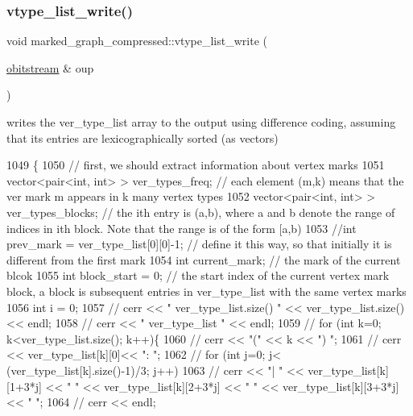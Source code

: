 \subsubsection{\texorpdfstring{vtype\+\_\+list\+\_\+write()}{vtype\_list\_write()}}
{\footnotesize\ttfamily void marked\+\_\+graph\+\_\+compressed\+::vtype\+\_\+list\+\_\+write (\begin{DoxyParamCaption}\item[{\hyperlink{classobitstream}{obitstream} \&}]{oup }\end{DoxyParamCaption})}



writes the ver\+\_\+type\+\_\+list array to the output using difference coding, assuming that its entries are lexicographically sorted (as vectors) 


\begin{DoxyCode}
1049                                                              \{
1050   \textcolor{comment}{// first, we should extract information about vertex marks}
1051   vector<pair<int, int> > ver\_types\_freq; \textcolor{comment}{// each element (m,k) means that the ver mark m appears in k many
       vertex types}
1052   vector<pair<int, int> > ver\_types\_blocks; \textcolor{comment}{// the ith entry is (a,b), where a and b denote the range of
       indices in ith block. Note that the range is of the form [a,b)}
1053   \textcolor{comment}{//int prev\_mark = ver\_type\_list[0][0]-1; // define it this way, so that initially it is different from
       the first mark}
1054   \textcolor{keywordtype}{int} current\_mark; \textcolor{comment}{// the mark of the current blcok}
1055   \textcolor{keywordtype}{int} block\_start = 0; \textcolor{comment}{// the start index of the current vertex mark block, a block is subsequent entries
       in ver\_type\_list with the same vertex marks}
1056   \textcolor{keywordtype}{int} i = 0;
1057   \textcolor{comment}{// cerr << " ver\_type\_list.size() " << ver\_type\_list.size() << endl;}
1058   \textcolor{comment}{// cerr << " ver\_type\_list " << endl;}
1059   \textcolor{comment}{// for (int k=0; k<ver\_type\_list.size(); k++)\{}
1060   \textcolor{comment}{//   cerr << "(" << k << ") ";}
1061   \textcolor{comment}{//   cerr << ver\_type\_list[k][0]<< ": ";}
1062   \textcolor{comment}{//   for (int j=0; j< (ver\_type\_list[k].size()-1)/3; j++)}
1063   \textcolor{comment}{//     cerr << "| " << ver\_type\_list[k][1+3*j] << " " << ver\_type\_list[k][2+3*j] << " " <<
       ver\_type\_list[k][3+3*j] << " ";}
1064   \textcolor{comment}{//   cerr << endl;}

\end{DoxyCode}
